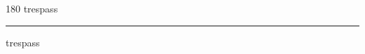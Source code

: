 
\begin{frame}
\begin{center}
\begin{turn}{180}
{\fontsize{2.5cm}{1em}\selectfont trespass}
\end{turn}
\vspace{1em}\par  
\hrule
\vspace{1em}\par  
{\fontsize{2.5cm}{1em}\selectfont trespass}
\end{center}
\end{frame}
